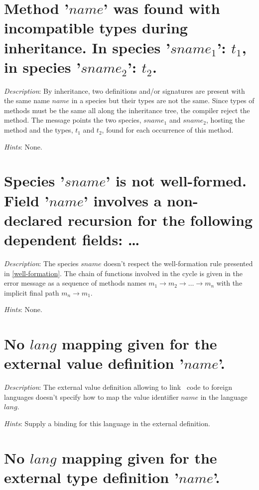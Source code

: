 \section*{Method '$name$' was found with incompatible types during
  inheritance. In species '$sname_1$': $t_1$, in species '$sname_2$':
  $t_2$.}
{\em Description}: By inheritance, two definitions and/or signatures
are present with the same name $name$ in a species but their types are
not the same. Since types of methods must be the same all along the
inheritance tree, the compiler reject the method. The message points
the two species, $sname_1$ and $sname_2$, hosting the method and the
types, $t_1$ and $t_2$, found for each occurrence of this method.

{\em Hints}: None.



\section*{Species '$sname$' is not well-formed. Field '$name$' involves
  a non-declared recursion for the following dependent fields: \ldots}

{\em Description}: The species $sname$ doesn't respect the
well-formation rule presented in \ref{well-formation}. The chain of
functions involved in the cycle is given in the error message as a
sequence of methods names
$m_1 \rightarrow m_2 \rightarrow \ldots \rightarrow m_n$ with the
implicit final path $m_n \rightarrow m_1$.

{\em Hints}: None.



\section*{No $lang$ mapping given for the external value definition
  '$name$'.}

{\em Description}: The external value definition allowing to link
\focal\ code to foreign languages doesn't specify how to map the value
identifier $name$ in the language $lang$.

{\em Hints}: Supply a binding for this language in the external
definition.



\section*{No $lang$ mapping given for the external type definition
  '$name$'.}

